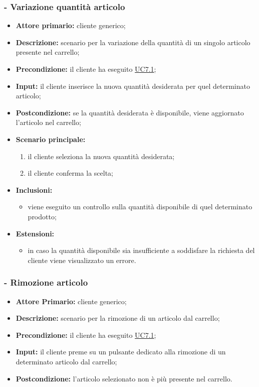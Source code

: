 \subsubsection{ - Variazione quantità articolo}
\begin{itemize}
    \item \textbf{Attore primario:} cliente generico;
    \item \textbf{Descrizione:} scenario per la variazione della quantità di un singolo articolo presente nel carrello;
    \item \textbf{Precondizione:} il cliente ha eseguito \hyperref[UC7.1]{UC7.1};
    \item \textbf{Input:} il cliente inserisce la nuova quantità desiderata per quel determinato articolo;
    \item \textbf{Postcondizione:} se la quantità desiderata è disponibile, viene aggiornato l'articolo nel carrello;
    \item \textbf{Scenario principale:}
    \begin{enumerate}
        \item il cliente seleziona la nuova quantità desiderata;
        \item il cliente conferma la scelta;
    \end{enumerate}
    \item \textbf{Inclusioni:}
    \begin{itemize}
        \item viene eseguito un controllo sulla quantità disponibile di quel determinato prodotto;
    \end{itemize}
    \item \textbf{Estensioni:}
    \begin{itemize}
        \item in caso la quantità disponibile sia insufficiente a soddisfare la richiesta del cliente viene visualizzato un errore.
    \end{itemize}
\end{itemize}

\stepsubUserCase
\subsubsection{ - Rimozione articolo}
\begin{itemize}
    \item \textbf{Attore Primario:} cliente generico;
    \item \textbf{Descrizione:} scenario per la rimozione di un articolo dal carrello;
    \item \textbf{Precondizione:} il cliente ha eseguito \hyperref[UC7.1]{UC7.1};
    \item \textbf{Input:} il cliente preme su un pulsante dedicato alla rimozione di un determinato articolo dal carrello;
    \item \textbf{Postcondizione:} l'articolo selezionato non è più presente nel carrello.
\end{itemize}

